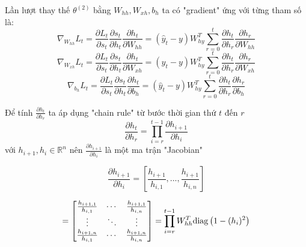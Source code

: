 Lần lượt thay thế $\theta^{(2)}$ bằng $W_{hh}, W_{xh}, b_h$ ta có "gradient" ứng với từng tham số là:
\begin{equation} \label{gradientWRTSt12}
	\nabla_{W_{hh}}L_t = \frac{\partial L_t}{\partial s_t} \frac{\partial s_t}{\partial h_t} \frac{\partial h_t}{\partial W_{hh}}  =  (\hat{y}_t - y) W_{hy}^T \sum_{r=0}^{t} \frac{\partial h_{t}}{\partial h_r} \frac{\partial h_r}{\partial W_{hh}}
\end{equation}
\begin{equation} \label{gradientWRTSt13}
	\nabla_{W_{xh}}L_t = \frac{\partial L_t}{\partial s_t} \frac{\partial s_t}{\partial h_t} \frac{\partial h_t}{\partial W_{xh}}  =  (\hat{y}_t - y) W_{hy}^T \sum_{r=0}^{t} \frac{\partial h_{t}}{\partial h_r} \frac{\partial h_r}{\partial W_{xh}}
\end{equation}
\begin{equation} \label{gradientWRTSt14}
	\nabla_{b_h}L_t = \frac{\partial L_t}{\partial s_t} \frac{\partial s_t}{\partial h_t} \frac{\partial h_t}{\partial b_h}  =  (\hat{y}_t - y) W_{hy}^T \sum_{r=0}^{t} \frac{\partial h_{t}}{\partial h_r} \frac{\partial h_r}{\partial b_h}
\end{equation}

Để tính $\frac{\partial h_t}{\partial h_r}$ ta áp dụng "chain rule" từ bước thời gian thứ $t$ đến $r$
\begin{equation} \label{gradientWRTSt15}
	\frac{\partial h_t}{\partial h_r} = \prod_{i=r}^{t - 1} \frac{\partial h_{i+1}}{\partial h_i}
\end{equation}
với $h_{i+1},h_i \in \mathbb{R}^n$ nên $\frac{\partial h_{i+1}}{\partial h_i}$ là một ma trận "Jacobian"

\begin{equation} \label{gradientWRTSt16}
	\frac{\partial h_{i+1}}{\partial h_i} = \left[ \frac{h_{i+1}}{h_{i,1}}, ..., \frac{h_{i+1}}{h_{i,n}} \right] 
\end{equation}

\begin{equation} \label{gradientWRTSt17}
	= \begin{bmatrix}
  	\frac{h_{i+1, 1}}{h_{i,1}} & \cdots & \frac{h_{i+1,1}}{h_{i,n}}\\
   	\vdots & \ddots & \vdots\\
   	\frac{h_{i+1, n}}{h_{i,1}} & \cdots & \frac{h_{i+1,n}}{h_{i,n}} 
	\end{bmatrix} = \prod_{i=r}^{t - 1} W_{hh}^T \mathrm{diag} \left( 1 - (h_i)^2 \right)
\end{equation}

